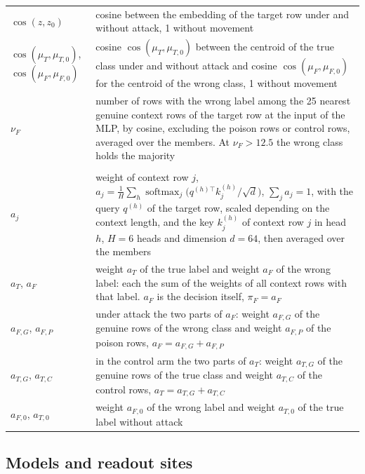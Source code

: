 \documentclass[pdflatex,sn-mathphys-num]{sn-jnl}
\newcommand{\pf}{\pi_F}
\begin{document}
\begin{table}[!t]
\begin{tabularx}{\textwidth}{@{}>{\raggedright\arraybackslash}p{2.6cm} >{\raggedright\arraybackslash}X@{}}
$\cos(z, z_0)$ & cosine between the embedding of the target row under and without attack, 1 without movement \\
$\cos(\mu_T, \mu_{T,0})$, $\cos(\mu_F, \mu_{F,0})$ & cosine $\cos(\mu_T, \mu_{T,0})$ between the centroid of the true class under and without attack and cosine $\cos(\mu_F, \mu_{F,0})$ for the centroid of the wrong class, 1 without movement \\
$\nu_F$ & number of rows with the wrong label among the 25 nearest genuine context rows of the target row at the input of the MLP, by cosine, excluding the poison rows or control rows, averaged over the members. At $\nu_F > 12.5$ the wrong class holds the majority \\
\midrule
\multicolumn{2}{@{}l}{TabPFN: weights in the decoder} \\
$a_j$ & weight of context row $j$, $a_j = \tfrac{1}{H}\sum_{h} \operatorname{softmax}_j\bigl(q^{(h)\top} k_j^{(h)}/\sqrt{d}\bigr)$, $\sum_j a_j = 1$, with the query $q^{(h)}$ of the target row, scaled depending on the context length, and the key $k_j^{(h)}$ of context row $j$ in head $h$, $H = 6$ heads and dimension $d = 64$, then averaged over the members \\
$a_T$, $a_F$ & weight $a_T$ of the true label and weight $a_F$ of the wrong label: each the sum of the weights of all context rows with that label. $a_F$ is the decision itself, $\pf = a_F$ \\
$a_{F,G}$, $a_{F,P}$ & under attack the two parts of $a_F$: weight $a_{F,G}$ of the genuine rows of the wrong class and weight $a_{F,P}$ of the poison rows, $a_F = a_{F,G} + a_{F,P}$ \\
$a_{T,G}$, $a_{T,C}$ & in the control arm the two parts of $a_T$: weight $a_{T,G}$ of the genuine rows of the true class and weight $a_{T,C}$ of the control rows, $a_T = a_{T,G} + a_{T,C}$ \\
$a_{F,0}$, $a_{T,0}$ & weight $a_{F,0}$ of the wrong label and weight $a_{T,0}$ of the true label without attack \\
\bottomrule
\end{tabularx}
\end{table}

\subsection{Models and readout sites}
\label{sec:modelle}
\end{document}
